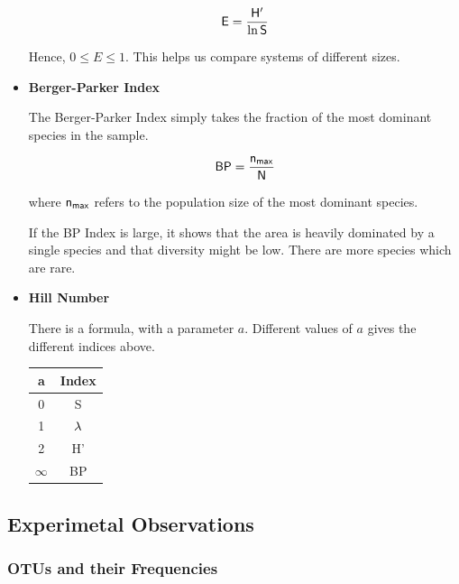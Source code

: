 \documentclass[twocolumn]{article}
\begin{document}
\begin{itemize}
    \[
        \sf E = \frac{H'}{\ln S}    
    \]

    Hence, $0 \leqslant E \leqslant 1$. This helps us compare systems of different sizes.

    \item \textbf{Berger-Parker Index}
    
    The Berger-Parker Index simply takes the fraction of the most dominant species in the sample.

    \[ 
        \sf BP = \frac{n_{max}}{N}    
    \]

    where $\sf n_{max}$ refers to the population size of the most dominant species. 

    If the BP Index is large, it shows that the area is heavily dominated by a single species and that diversity might be low. There are more species which are rare.

    \item \textbf{Hill Number}
    
    There is a formula, with a parameter $a$. Different values of $a$ gives the different indices above.
    
    \begin{center}
    \begin{tabular}{c|c}
        \textbf{a} & \textbf{Index} \\ \hline
        0 & S \\
        1 & $\sf \lambda$ \\
        2 & H' \\
        $\infty$ & BP
    \end{tabular}
    \end{center}
\end{itemize}

\subsection{Experimetal Observations}

\subsubsection{OTUs and their Frequencies}
\end{document}
